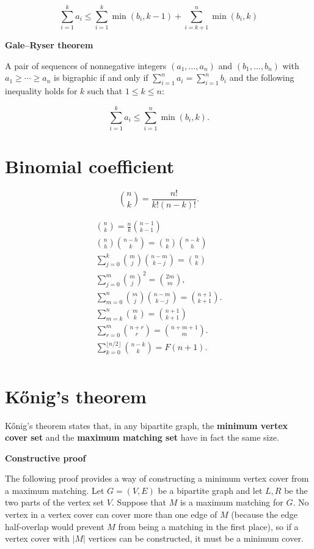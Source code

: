 \documentclass[a4paper]{article}
\begin{document}
\begin{landscape}
\begin{multicols}{2}
$$\sum _{i=1}^{k}a_{i}\leq \sum _{i=1}^{k}\min(b_{i},k-1)+\sum _{i=k+1}^{n}\min(b_{i},k)$$

\textbf{Gale–Ryser theorem}

A pair of sequences of nonnegative integers $(a_{1},\ldots ,a_{n})$ and $(b_{1},\ldots ,b_{n})$ with $a_{1}\geq \cdots \geq a_{n}$ is bigraphic if and only if $ \sum _{i=1}^{n}a_{i}=\sum _{i=1}^{n}b_{i}$ and the following inequality holds for $k$ such that $ 1\leq k\leq n$:

$$ \sum _{i=1}^{k}a_{i}\leq \sum _{i=1}^{n}\min(b_{i},k).$$

\section{Binomial coefficient}

$${\binom {n}{k}}={\frac {n!}{k!(n-k)!}}. $$

\begin{gather*}
{\binom {n}{k}}={\frac {n}{k}}{\binom {n-1}{k-1}}\\	
{\binom {n}{h}}{\binom {n-h}{k}}={\binom {n}{k}}{\binom {n-k}{h}}\\
\sum _{j=0}^{k}{\binom {m}{j}}{\binom {n-m}{k-j}}={\binom {n}{k}}\\
\sum _{j=0}^{m}{\binom {m}{j}}^{2}={\binom {2m}{m}},\\
\sum _{m=0}^{n}{\binom {m}{j}}{\binom {n-m}{k-j}}={\binom {n+1}{k+1}}.\\
\sum _{m=k}^{n}{\binom {m}{k}}={\binom {n+1}{k+1}}\\
\sum _{r=0}^{m}{\binom {n+r}{r}}={\binom {n+m+1}{m}}.\\
\sum _{k=0}^{\lfloor n/2\rfloor }{\binom {n-k}{k}}=F(n+1).\\
\end{gather*}

\section{Kőnig's theorem}
Kőnig's theorem states that, in any bipartite graph, the \textbf{minimum vertex cover set} and the \textbf{maximum matching set} have in fact the same size.

\textbf{Constructive proof}

The following proof provides a way of constructing a minimum vertex cover from a maximum matching. Let $G=(V,E)$ be a bipartite graph and let $L,R$ be the two parts of the vertex set $V$. Suppose that $M$ is a maximum matching for $G$. No vertex in a vertex cover can cover more than one edge of $M$ (because the edge half-overlap would prevent $M$ from being a matching in the first place), so if a vertex cover with $|M|$ vertices can be constructed, it must be a minimum cover.


\end{multicols}
\end{landscape}
\end{document}
